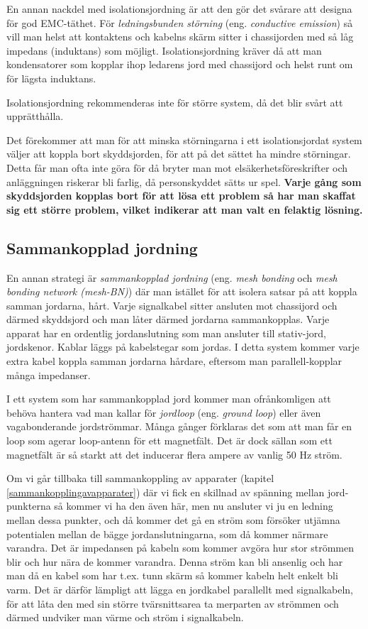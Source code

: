 En annan nackdel med isolationsjordning är att den gör det svårare att designa
för god EMC-täthet. För \emph{ledningsbunden störning} (eng. \emph{conductive
emission}) så vill man helst att kontaktens och kabelns skärm sitter i
chassijorden med så låg impedans (induktans) som möjligt. Isolationsjordning
kräver då att man kondensatorer som kopplar ihop ledarens jord med chassijord
och helst runt om för lägsta induktans.

Isolationsjordning rekommenderas inte för större system, då det blir svårt
att upprätthålla.

Det förekommer att man för att minska störningarna i ett isolationsjordat
system väljer att koppla bort skyddsjorden, för att på det sättet ha mindre
störningar. Detta får man ofta inte göra för då bryter man mot
elsäkerhetsföreskrifter och anläggningen riskerar bli farlig, då personskyddet
sätts ur spel. \textbf{Varje gång som skyddsjorden kopplas bort för att lösa ett
problem så har man skaffat sig ett större problem, vilket indikerar att man
valt en felaktig lösning.}

\subsection{Sammankopplad jordning}

En annan strategi är \emph{sammankopplad jordning} (eng. \emph{mesh bonding}
och \emph{mesh bonding network (mesh-BN)})
där man istället för att isolera satsar på att koppla samman jordarna, hårt.
Varje signalkabel sitter ansluten mot chassijord och därmed skyddsjord och
man låter därmed jordarna sammankopplas. Varje apparat har en ordentlig
jordanslutning som man ansluter till stativ-jord, jordskenor. Kablar läggs på
kabelstegar som jordas. I detta system kommer varje extra kabel koppla samman
jordarna hårdare, eftersom man parallell-kopplar många impedanser.

I ett system som har sammankopplad jord kommer man ofrånkomligen att behöva
hantera vad man kallar för \emph{jordloop} (eng. \emph{ground loop}) eller även
vagabonderande jordströmmar. Många gånger förklaras det som att man får en
loop som agerar loop-antenn för ett magnetfält. Det är dock sällan som ett
magnetfält är så starkt att det inducerar flera ampere av vanlig 50 Hz ström.

Om vi går tillbaka till sammankoppling av apparater (kapitel
\ref{sammankopplingavapparater}) där vi fick en skillnad av spänning mellan
jord-punkterna så kommer vi ha den även här, men nu ansluter vi ju en ledning
mellan dessa punkter, och då kommer det gå en ström som försöker utjämna
potentialen mellan de bägge jordanslutningarna, som då kommer närmare varandra.
Det är impedansen på kabeln som kommer avgöra hur stor strömmen blir och hur
nära de kommer varandra. Denna ström kan bli ansenlig och har man då en kabel
som har t.ex. tunn skärm så kommer kabeln helt enkelt bli varm. Det är därför
lämpligt att lägga en jordkabel parallellt med signalkabeln, för att låta den
med sin större tvärsnittsarea ta merparten av strömmen och därmed undviker man
värme och ström i signalkabeln.

